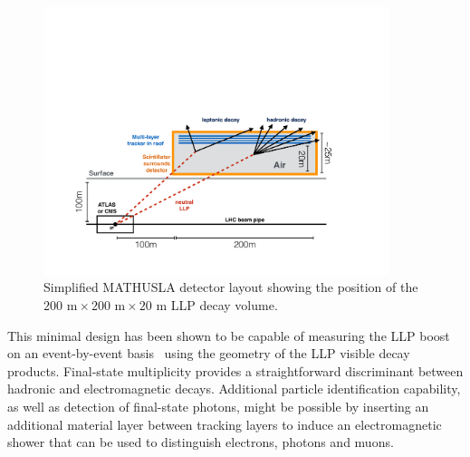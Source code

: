 \begin{figure}
\begin{center}
\includegraphics[width=0.9\textwidth]{figures/mathusla/3_mathusla.pdf}
\end{center}
\caption{
Simplified MATHUSLA detector layout showing the position of the $200\,\,\mathrm{m} \times 200\,\,\mathrm{m} \times 20\,\,\mathrm{m}$ LLP decay volume.
}
\label{f.mathuslalayout}
\end{figure}

This minimal design has been shown to be capable of measuring the LLP boost on an event-by-event basis~\cite{Curtin:2017izq} using the geometry of the LLP visible decay products. Final-state multiplicity provides a straightforward discriminant between hadronic and electromagnetic decays. Additional particle identification capability, as well as detection of final-state photons, might be possible by inserting an additional material layer between tracking layers to induce an electromagnetic shower that can be used to distinguish electrons, photons and muons.


